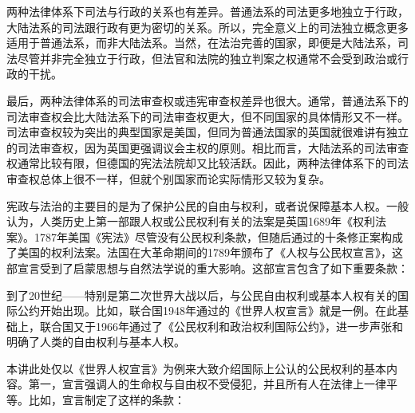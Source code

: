 两种法律体系下司法与行政的关系也有差异。普通法系的司法更多地独立于行政，大陆法系的司法跟行政有更为密切的关系。所以，完全意义上的司法独立概念更多适用于普通法系，而非大陆法系。当然，在法治完善的国家，即便是大陆法系，司法尽管并非完全独立于行政，但法官和法院的独立判案之权通常不会受到政治或行政的干扰。

最后，两种法律体系的司法审查权或违宪审查权差异也很大。通常，普通法系下的司法审查权会比大陆法系下的司法审查权更大，但不同国家的具体情形又不一样。司法审查权较为突出的典型国家是美国，但同为普通法国家的英国就很难讲有独立的司法审查权，因为英国更强调议会主权的原则。相比而言，大陆法系的司法审查权通常比较有限，但德国的宪法法院却又比较活跃。因此，两种法律体系下的司法审查权总体上很不一样，但就个别国家而论实际情形又较为复杂。


宪政与法治的主要目的是为了保护公民的自由与权利，或者说保障基本人权。一般认为，人类历史上第一部跟人权或公民权利有关的法案是英国1689年《权利法案》。1787年美国《宪法》尽管没有公民权利条款，但随后通过的十条修正案构成了美国的权利法案。法国在大革命期间的1789年颁布了《人权与公民权宣言》，这部宣言受到了启蒙思想与自然法学说的重大影响。这部宣言包含了如下重要条款：


到了20世纪——特别是第二次世界大战以后，与公民自由权利或基本人权有关的国际公约开始出现。比如，联合国1948年通过的《世界人权宣言》就是一例。在此基础上，联合国又于1966年通过了《公民权利和政治权利国际公约》，进一步声张和明确了人类的自由权利与基本人权。

本讲此处仅以《世界人权宣言》为例来大致介绍国际上公认的公民权利的基本内容。第一，宣言强调人的生命权与自由权不受侵犯，并且所有人在法律上一律平等。比如，宣言制定了这样的条款：

